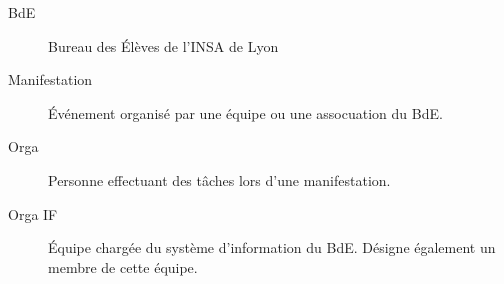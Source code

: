 \begin{description}
\item[BdE] Bureau des Élèves de l'INSA de Lyon
\item[Manifestation] Événement organisé par une équipe ou une assocuation du BdE.
\item[Orga] Personne effectuant des tâches lors d'une manifestation.
\item[Orga IF] Équipe chargée du système d'information du BdE. Désigne également un membre de cette équipe.

 \end{description}